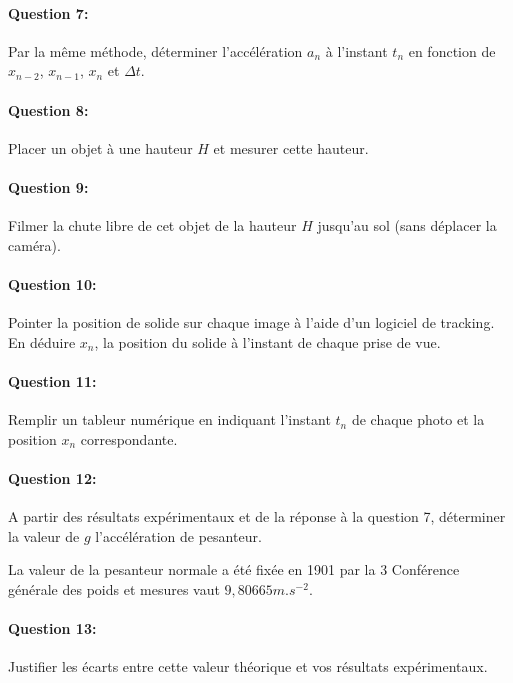 \paragraph{Question 7:} Par la même méthode, déterminer l'accélération $a_n$ à l'instant $t_n$ en fonction de $x_{n-2}$, $x_{n-1}$, $x_n$ et $\Delta t$.


\paragraph{Question 8:} Placer un objet à une hauteur $H$ et mesurer cette hauteur.

\paragraph{Question 9:} Filmer la chute libre de cet objet de la hauteur $H$ jusqu'au sol (sans déplacer la caméra).

\paragraph{Question 10:} Pointer la position de solide sur chaque image à l'aide d'un logiciel de tracking. En déduire $x_n$, la position du solide à l'instant de chaque prise de vue.

\paragraph{Question 11:} Remplir un tableur numérique en indiquant l'instant $t_n$ de chaque photo et la position $x_n$ correspondante.


\paragraph{Question 12:} A partir des résultats expérimentaux et de la réponse à la question 7, déterminer la valeur de $g$ l'accélération de pesanteur.

 La valeur de la pesanteur normale a été fixée en 1901 par la 3 Conférence générale des poids et mesures vaut $9,80665m.s^{-2}$.
 
\paragraph{Question 13:} Justifier les écarts entre cette valeur théorique et vos résultats expérimentaux.

